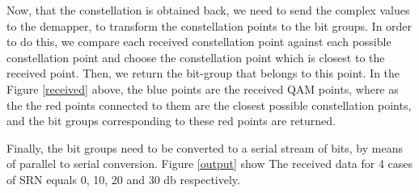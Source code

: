 Now, that the constellation is obtained back, we need to send the complex values to the demapper, to transform the constellation points to the bit groups. In order to do this, we compare each received constellation point against each possible constellation point and choose the constellation point which is closest to the received point. Then, we return the bit-group that belongs to this point. In the Figure \ref{received} above, the blue points are the received QAM points, where as the the red points connected to them are the closest possible constellation points, and the bit groups corresponding to these red points are returned.

Finally, the bit groups need to be converted to a serial stream of bits, by means of parallel to serial conversion. Figure \ref{output} show The received data for 4 cases of SRN equals 0, 10, 20 and 30 db respectively.

